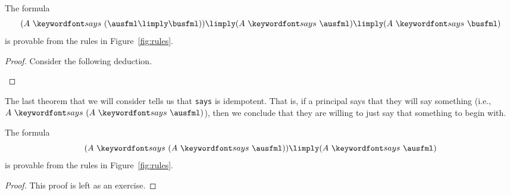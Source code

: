 \documentclass[11pt,twoside]{scrartcl}
\begin{document}
\begin{theorem}
The formula 
\[
(\says{A}{(\ausfml \limply \busfml)}) \limply (\says{A}{\ausfml}) \limply (\says{A}{\busfml})
\] 
is provable from the rules in Figure~\ref{fig:rules}.
\end{theorem}
\begin{proof}
Consider the following deduction.
\begin{sequentdeduction}[array]
 {
}
\end{sequentdeduction}
\end{proof}

The last theorem that we will consider tells us that \verb'says' is idempotent. That is, if a principal says that they will say something (i.e., $\says{A}{(\says{A}{\ausfml})}$), then we conclude that they are willing to just say that something to begin with.

\begin{theorem}
The formula
\[
(\says{A}{(\says{A}{\ausfml})}) \limply (\says{A}{\ausfml})
\]
is provable from the rules in Figure~\ref{fig:rules}.
\end{theorem}
\begin{proof}
This proof is left as an exercise.
\end{proof}



\end{document}
